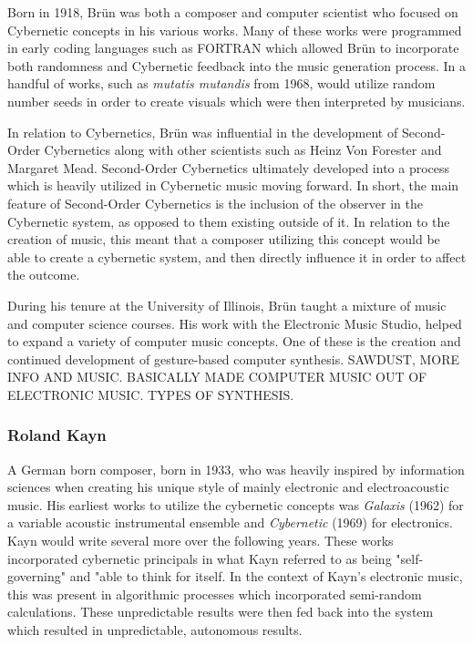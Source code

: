 Born in 1918, Brün was both a composer and computer scientist who focused on Cybernetic concepts in his various works. Many of these works were programmed in early coding languages such as FORTRAN which allowed Brün to incorporate both randomness and Cybernetic feedback into the music generation process. In a handful of works, such as \textit{mutatis mutandis} from 1968, would utilize random number seeds in order to create visuals which were then interpreted by musicians.

In relation to Cybernetics, Brün was influential in the development of Second-Order Cybernetics along with other scientists such as Heinz Von Forester and Margaret Mead. Second-Order Cybernetics ultimately developed into a process which is heavily utilized in Cybernetic music moving forward. In short, the main feature of Second-Order Cybernetics is the inclusion of the observer in the Cybernetic system, as opposed to them existing outside of it\cite{Scott_2nd_order_Cyber}. In relation to the creation of music, this meant that a composer utilizing this concept would be able to create a cybernetic system, and then directly influence it in order to affect the outcome.

During his tenure at the University of Illinois, Brün taught a mixture of music and computer science courses. His work with the Electronic Music Studio, helped to expand a variety of computer music concepts. One of these is the creation and continued development of gesture-based computer synthesis. 
SAWDUST, MORE INFO AND MUSIC. BASICALLY MADE COMPUTER MUSIC OUT OF ELECTRONIC MUSIC. TYPES OF SYNTHESIS.

\subsubsection{Roland Kayn} %

A German born composer, born in 1933, who was heavily inspired by information sciences when creating his unique style of mainly electronic and electroacoustic music\cite{rolandKaynBio}. His earliest works to utilize the cybernetic concepts was \textit{Galaxis} (1962) for a variable acoustic instrumental ensemble and \textit{Cybernetic} (1969) for electronics. Kayn would write several more over the following years. These works incorporated cybernetic principals in what Kayn referred to as being "self-governing"\cite{rolandKaynBio} and "able to think for itself\cite{Kayn_Elektroakustische_Projekte}. In the context of Kayn's electronic music, this was present in algorithmic processes which incorporated semi-random calculations. These unpredictable results were then fed back into the system which resulted in unpredictable, autonomous results\cite{rolandKaynBio}.


